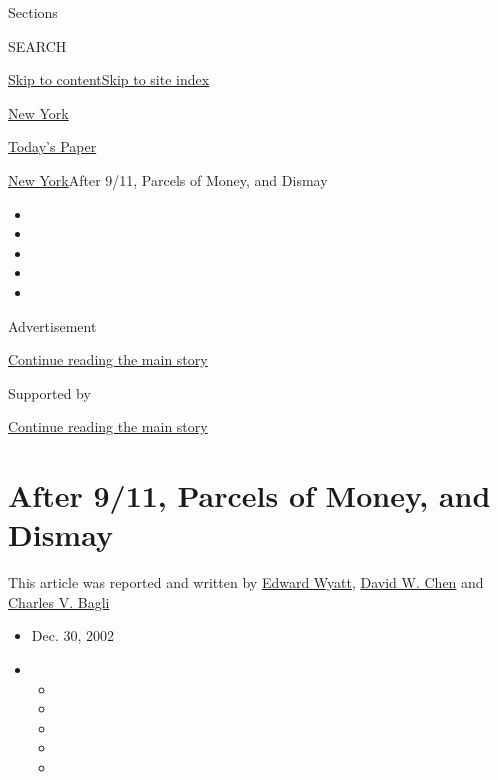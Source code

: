 Sections

SEARCH

\protect\hyperlink{site-content}{Skip to
content}\protect\hyperlink{site-index}{Skip to site index}

\href{https://www.nytimes3xbfgragh.onion/section/nyregion}{New York}

\href{https://myaccount.nytimes3xbfgragh.onion/auth/login?response_type=cookie\&client_id=vi}{}

\href{https://www.nytimes3xbfgragh.onion/section/todayspaper}{Today's
Paper}

\href{/section/nyregion}{New York}\textbar{}After 9/11, Parcels of
Money, and Dismay

\begin{itemize}
\item
\item
\item
\item
\item
\end{itemize}

Advertisement

\protect\hyperlink{after-top}{Continue reading the main story}

Supported by

\protect\hyperlink{after-sponsor}{Continue reading the main story}

\hypertarget{after-911-parcels-of-money-and-dismay}{%
\section{After 9/11, Parcels of Money, and
Dismay}\label{after-911-parcels-of-money-and-dismay}}

This article was reported and written by
\href{https://www.nytimes3xbfgragh.onion/by/edward-wyatt}{Edward Wyatt},
\href{https://www.nytimes3xbfgragh.onion/by/david-w-chen}{David W. Chen}
and \href{https://www.nytimes3xbfgragh.onion/by/charles-v-bagli}{Charles
V. Bagli}

\begin{itemize}
\item
  Dec. 30, 2002
\item
  \begin{itemize}
  \item
  \item
  \item
  \item
  \item
  \end{itemize}
\end{itemize}


